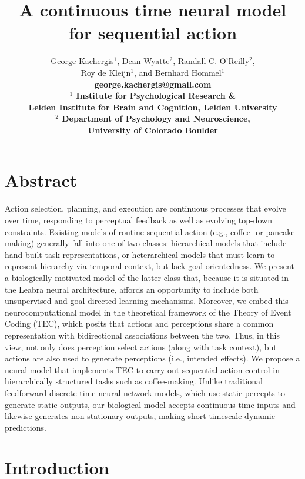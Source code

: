\documentclass[10pt,letterpaper]{article}
\title{A continuous time neural model for sequential action}
\author{George Kachergis$^1$, Dean Wyatte$^2$, Randall C. O'Reilly$^2$, \\
	Roy de Kleijn$^1$, and Bernhard Hommel$^1$ \\
	\bf george.kachergis@gmail.com \\
	$^1$ Institute for Psychological Research \& \\
	Leiden Institute for Brain and Cognition, Leiden University \\
	$^2$ Department of Psychology and Neuroscience, \\
	University of Colorado Boulder }
\date{}
\numberwithin{equation}{section}
\begin{document}
\maketitle



\sloppy

\section*{Abstract}

Action selection, planning, and execution are continuous processes that evolve over time, responding to perceptual feedback as well as evolving top-down constraints. Existing models of routine sequential action (e.g., coffee- or pancake-making) generally fall into one of two classes: hierarchical models that include hand-built task representations, or heterarchical models that must learn to represent hierarchy via temporal context, but lack goal-orientedness. We present a biologically-motivated model of the latter class that, because it is situated in the Leabra neural architecture, affords an opportunity to include both unsupervised and goal-directed learning mechanisms.  Moreover, we embed this neurocomputational model in the theoretical framework of the Theory of Event Coding (TEC), which posits that actions and perceptions share a common representation with bidirectional associations between the two. Thus, in this view, not only does perception select actions (along with task context), but actions are also used to generate perceptions (i.e., intended effects). We propose a neural model that implements TEC to carry out sequential action control in hierarchically structured tasks such as coffee-making. Unlike traditional feedforward discrete-time neural network models, which use static percepts to generate static outputs, our biological model accepts continuous-time inputs and likewise generates non-stationary outputs, making short-timescale dynamic predictions. 

\section*{Introduction}
\end{document}
